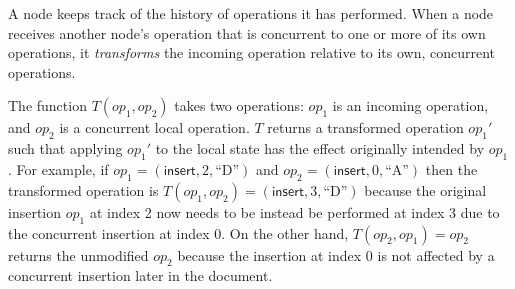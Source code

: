 \begin{frame}
\begin{center}
    \end{center}
\end{frame}
\label{l:op-transform}

A node keeps track of the history of operations it has performed.
When a node receives another node's operation that is concurrent to one or more of its own operations, it \emph{transforms} the incoming operation relative to its own, concurrent operations.

The function $T(\mathit{op}_1, \mathit{op}_2)$ takes two operations: $\mathit{op}_1$ is an incoming operation, and $\mathit{op}_2$ is a concurrent local operation.
$T$ returns a transformed operation $\mathit{op}_1'$ such that applying $\mathit{op}_1'$ to the local state has the effect originally intended by $\mathit{op}_1$.
For example, if $\mathit{op}_1 = (\mathsf{insert}, 2, \text{``D''})$ and $\mathit{op}_2 = (\mathsf{insert}, 0, \text{``A''})$ then the transformed operation is $T(\mathit{op}_1, \mathit{op}_2) = (\mathsf{insert}, 3, \text{``D''})$ because the original insertion $\mathit{op}_1$ at index 2 now needs to be instead be performed at index 3 due to the concurrent insertion at index 0.
On the other hand, $T(\mathit{op}_2, \mathit{op}_1) = \mathit{op}_2$ returns the unmodified $\mathit{op}_2$ because the insertion at index 0 is not affected by a concurrent insertion later in the document.


